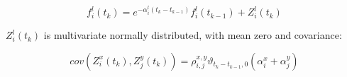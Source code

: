 \documentclass{article}
\begin{document}
\begin{equation}
    f_i^l(t_k) = e^{-\alpha_i^l(t_k - t_{k-1})}f_i^l(t_{k-1}) + Z_i^l(t_k)
\end{equation}

$Z_i^l(t_k)$ is multivariate normally distributed, with mean zero and covariance:

\begin{equation}
    cov(Z_i^x(t_k), Z_j^y(t_k)) = \rho_{i, j}^{x, y} \vartheta_{t_k-t_{k-1}, 0}(\alpha_i^x + \alpha_j^y)
\end{equation}




\end{document}
